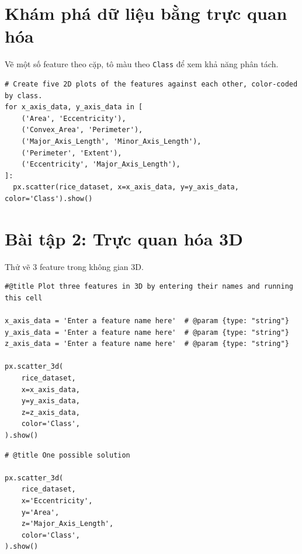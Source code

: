 \documentclass[12pt,a4paper]{article}
\begin{document}
\section{Khám phá dữ liệu bằng trực quan hóa}

\begin{phuongphap}[title={Vẽ các đồ thị 2D}]
Vẽ một số feature theo cặp, tô màu theo \texttt{Class} để xem khả năng phân tách.
\end{phuongphap}

\begin{lstlisting}
# Create five 2D plots of the features against each other, color-coded by class.
for x_axis_data, y_axis_data in [
    ('Area', 'Eccentricity'),
    ('Convex_Area', 'Perimeter'),
    ('Major_Axis_Length', 'Minor_Axis_Length'),
    ('Perimeter', 'Extent'),
    ('Eccentricity', 'Major_Axis_Length'),
]:
  px.scatter(rice_dataset, x=x_axis_data, y=y_axis_data, color='Class').show()
\end{lstlisting}

\section{Bài tập 2: Trực quan hóa 3D}

\begin{phuongphap}[title={Yêu cầu}]
Thử vẽ 3 feature trong không gian 3D.
\end{phuongphap}

\begin{lstlisting}
#@title Plot three features in 3D by entering their names and running this cell

x_axis_data = 'Enter a feature name here'  # @param {type: "string"}
y_axis_data = 'Enter a feature name here'  # @param {type: "string"}
z_axis_data = 'Enter a feature name here'  # @param {type: "string"}

px.scatter_3d(
    rice_dataset,
    x=x_axis_data,
    y=y_axis_data,
    z=z_axis_data,
    color='Class',
).show()
\end{lstlisting}

\begin{lstlisting}
# @title One possible solution

px.scatter_3d(
    rice_dataset,
    x='Eccentricity',
    y='Area',
    z='Major_Axis_Length',
    color='Class',
).show()
\end{lstlisting}
\end{document}
